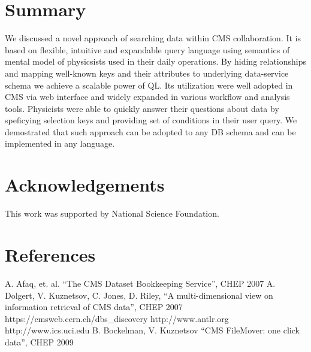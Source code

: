 \documentclass[a4paper]{jpconf}
\begin{document}
\section{Summary}
We discussed a novel approach of searching data within CMS
collaboration. It is based on flexible,
intuitive and expandable query language using
semantics of mental model of physicsists used in their 
daily operations.
By hiding relationships and mapping well-known
keys and their attributes to underlying data-service
schema we achieve a scalable power of QL. Its utilization
were well adopted in CMS via web interface and widely
expanded in various workflow and analysis tools. Physicists
were able to quickly answer their questions about data by
speficying selection keys and providing set of conditions
in their user query. We demostrated that such approach
can be adopted to any DB schema and can be implemented
in any language.

\section{Acknowledgements}

This work was supported by National Science Foundation.

\section*{References}
\begin{thebibliography}{9}
 A. Afaq, et. al. ``The CMS Dataset Bookkeeping Service'', CHEP 2007 
 A. Dolgert, V. Kuznetsov, C. Jones, D. Riley, 
``A multi-dimensional view on information retrieval of CMS data'', CHEP 2007
 https://cmsweb.cern.ch/dbs\_discovery
 http://www.antlr.org
 http://www.ics.uci.edu
 B. Bockelman, V. Kuznetsov ``CMS FileMover: one click data'', CHEP 2009

\end{thebibliography}
\end{document}
